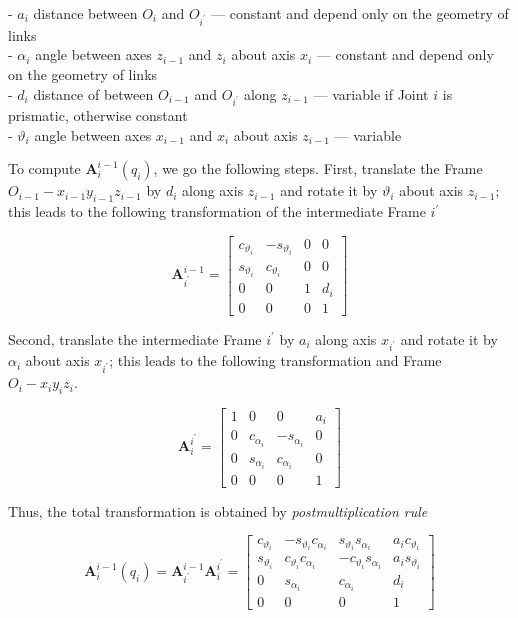 \documentclass[10pt]{article}
\begin{document}
    - $a_{i}$ distance between $O_{i}$ and $O_{i^{\prime}}$ --- constant and depend only on the geometry of links\\
     - $\alpha_{i}$ angle between axes $z_{i-1}$ and $z_{i}$ about axis $x_{i}$  --- constant and depend only on the geometry of links\\
     - $d_{i}$ distance of between $O_{i-1}$ and $O_{i^{\prime}}$ along $z_{i-1}$ ---  variable if Joint $i$ is prismatic,  otherwise constant\\
    - $\vartheta_{i}$ angle between axes $x_{i-1}$ and $x_{i}$ about axis $z_{i-1}$ ---  variable 

\noindent
To  compute $\boldsymbol{A}_{i}^{i-1}\left(q_{i}\right)$, we go the following steps. First,  translate the   Frame  $O_{i-1}-x_{i-1} y_{i-1} z_{i-1}$ by $d_{i}$ along axis $z_{i-1}$ and rotate it by $\vartheta_{i}$ about axis $z_{i-1}$; this leads to the following transformation of the intermediate Frame $i^{\prime}$ 

$$
\boldsymbol{A}_{i^{\prime}}^{i-1}=\left[\begin{array}{cccc}
c_{\vartheta_{i}} & -s_{\vartheta_{i}} & 0 & 0 \\
s_{\vartheta_{i}} & c_{\vartheta_{i}} & 0 & 0 \\
0 & 0 & 1 & d_{i} \\
0 & 0 & 0 & 1
\end{array}\right]
$$

Second,  translate the  intermediate Frame $i^{\prime}$ by $a_{i}$ along axis $x_{i^{\prime}}$ and rotate it by $\alpha_{i}$ about axis $x_{i^{\prime}}$; this  leads to the following transformation and Frame $O_{i}-x_{i} y_{i} z_{i}$. 

$$
\boldsymbol{A}_{i}^{i^{\prime}}=\left[\begin{array}{cccc}
1 & 0 & 0 & a_{i} \\
0 & c_{\alpha_{i}} & -s_{\alpha_{i}} & 0 \\
0 & s_{\alpha_{i}} & c_{\alpha_{i}} & 0 \\
0 & 0 & 0 & 1
\end{array}\right]
$$

Thus, the total transformation is obtained by \emph{postmultiplication rule}



$$
\boldsymbol{A}_{i}^{i-1}\left(q_{i}\right)=\boldsymbol{A}_{i^{\prime}}^{i-1} \boldsymbol{A}_{i}^{i^{\prime}}=\left[\begin{array}{cccc}
c_{\vartheta_{i}} & -s_{\vartheta_{i}} c_{\alpha_{i}} & s_{\vartheta_{i}} s_{\alpha_{i}} & a_{i} c_{\vartheta_{i}} \\
s_{\vartheta_{i}} & c_{\vartheta_{i}} c_{\alpha_{i}} & -c_{\vartheta_{i}} s_{\alpha_{i}} & a_{i} s_{\vartheta_{i}} \\
0 & s_{\alpha_{i}} & c_{\alpha_{i}} & d_{i} \\
0 & 0 & 0 & 1
\end{array}\right]
$$
\end{document}
